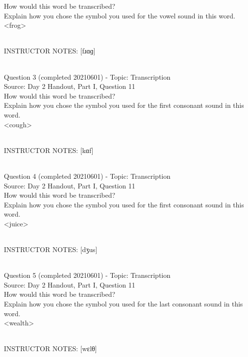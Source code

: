 \documentclass[12pt]{article}
\begin{document}
How would this word be transcribed?\\ Explain how you chose the symbol you used for the vowel sound in this word.\\

<frog>


~\\
INSTRUCTOR NOTES: [fɹɑɡ]


~\\

{\large Question 3} (completed 20210601) - Topic: Transcription\\
Source: Day 2 Handout, Part I, Question 11\\

How would this word be transcribed?\\ Explain how you chose the symbol you used for the first consonant sound in this word.\\

<cough>


~\\
INSTRUCTOR NOTES: [kɑf]


~\\

{\large Question 4} (completed 20210601) - Topic: Transcription\\
Source: Day 2 Handout, Part I, Question 11\\

How would this word be transcribed?\\ Explain how you chose the symbol you used for the first consonant sound in this word.\\

<juice>


~\\
INSTRUCTOR NOTES: [dʒus]


~\\

{\large Question 5} (completed 20210601) - Topic: Transcription\\
Source: Day 2 Handout, Part I, Question 11\\

How would this word be transcribed?\\ Explain how you chose the symbol you used for the last consonant sound in this word.\\

<wealth>


~\\
INSTRUCTOR NOTES: [wɛlθ]


~\\
\end{document}
